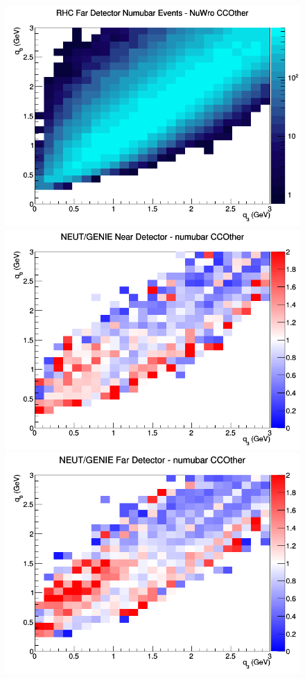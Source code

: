 \begin{figure}[h]
\endminipage
{}
\includegraphics[width=\linewidth]{eff_q0_q3/FGT/CCOther_RHC_FD_numubar_q3_q0_NuWro.png}
\endminipage
\newline
{}
\includegraphics[width=\linewidth]{eff_q0_q3/FGT/ratios/CCOther_NEUT_GENIE_numubar_near_q3_q0.png}
\endminipage
{}
\includegraphics[width=\linewidth]{eff_q0_q3/FGT/ratios/CCOther_NEUT_GENIE_numubar_far_q3_q0.png}

\end{figure}

